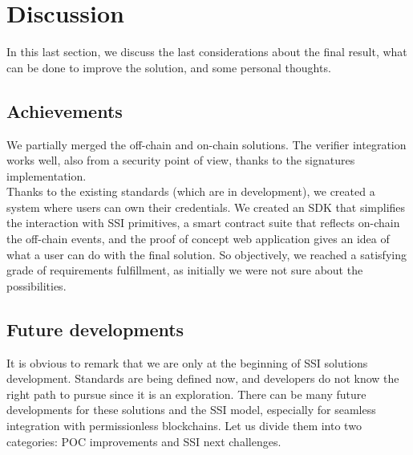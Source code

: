 \section{Discussion}
In this last section, we discuss the last considerations about the final result, what 
can be done to improve the solution, and some personal thoughts.

\subsection{Achievements}
We partially merged the off-chain and on-chain solutions. The verifier integration works well,
also from a security point of view, thanks to the signatures implementation.\\
Thanks to the existing standards (which are in development), we created a system where 
users can own their credentials. We created an SDK that simplifies the interaction with 
SSI primitives, a smart contract suite that reflects on-chain the off-chain events, and 
the proof of concept web application gives an idea of what a user can do with the final 
solution.
So objectively, we reached a satisfying grade of requirements fulfillment, as initially
we were not sure about the possibilities.

\subsection{Future developments}
It is obvious to remark that we are only at the beginning of SSI solutions development. 
Standards are being defined now, and developers do not know the right path to pursue 
since it is an exploration.
There can be many future developments for these solutions and the SSI model, especially
for seamless integration with permissionless blockchains. Let us divide them into two 
categories: POC improvements and SSI next challenges.
